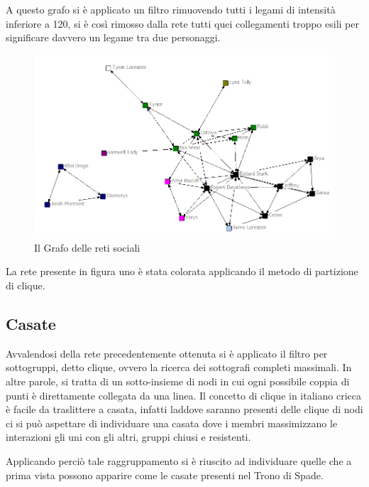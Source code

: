 \documentclass[a4paper]{article}
\begin{document}
A questo grafo si è applicato un filtro rimuovendo tutti i legami di intensità inferiore a 120, si è così rimosso dalla rete tutti quei collegamenti troppo esili per significare davvero un legame tra due personaggi. 

\begin{figure}[h]
\centering
\includegraphics[width=.9\textwidth]{picture/031.png}
\caption{Il Grafo delle reti sociali}
\label{fig:grafo-partito}
\end{figure}
La rete presente in figura uno è stata colorata applicando il metodo di partizione di clique.\\

\subsection{Casate}
Avvalendosi della rete precedentemente ottenuta si è applicato il filtro per sottogruppi, detto clique, ovvero la ricerca dei sottografi completi massimali. In altre parole, si tratta di un sotto-insieme di nodi in cui ogni possibile coppia di punti è direttamente collegata da una linea. Il concetto di clique in italiano cricca è facile da traslittere a casata, infatti laddove saranno presenti delle clique di nodi ci si può aspettare di individuare una casata dove i membri massimizzano le interazioni gli uni con gli altri, gruppi chiusi e resistenti.

Applicando perciò tale raggruppamento si è riuscito ad individuare quelle che a prima vista possono apparire come le casate presenti nel Trono di Spade.\\
\end{document}
